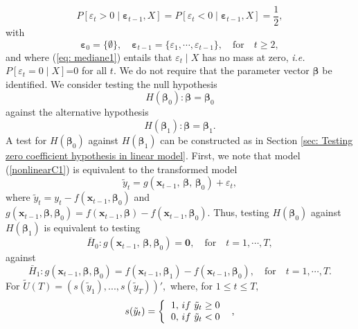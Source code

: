 \documentclass[harvard,11pt]{article}
\begin{document}
\begin{equation}\label{eq: mediane1}
P[\varepsilon_{t}> 0\mid \bm{{\varepsilon}}_{t-1},X]=P[\varepsilon_{t}<0\mid \bm{\varepsilon}_{t-1},X]=\frac{1}{2},
\end{equation}%
with
\[
\bm{\varepsilon}_{0}=\{\emptyset\},\quad\bm{\varepsilon}_{t-1}=\{\varepsilon_1,\cdots,\varepsilon_{t-1}\},\quad\text{for}\quad t\geq2,
\]
and where (\ref{eq: mediane1}) entails that $\varepsilon_t\mid X$ has no mass at zero, \emph{i.e.} $P[\varepsilon_t=0\mid X]$=0 for all $t$. We do not require that the
parameter vector $\bm{\beta} $ be identified. We consider testing the null hypothesis%
\begin{equation}
H(\bm{\beta}_{0}):\bm{\beta} =\bm{\beta} _{0}  \label{h01}
\end{equation}%
against the alternative hypothesis%
\begin{equation}
H(\bm{\beta}_{1}):\bm{\beta} =\bm{\beta}_{1}\text{.}  \label{h02}
\end{equation}%
A test for $H(\bm{\beta}_{0})$ against $H(\bm{\beta}_{1})$ can be constructed as in
Section \ref{sec: Testing zero coefficient hypothesis in linear model}.
First, we note that model (\ref{nonlinearC1}) is equivalent to the
transformed model%
\begin{equation*}
\tilde{y}_{t}=g(\bm{x}_{t-1},\,\bm{\beta} ,\,\bm{\beta} _{0})+\varepsilon_{t},
\end{equation*}%
where $\tilde{y}_{t}=y_{t}-f(\bm{x}_{t-1},\bm{\beta}_{0})$ and\ $g(\bm{x}_{t-1},\bm{\beta}
,\bm{\beta} _{0})=f(\bm{x}_{t-1},\bm{\beta} )-f(\bm{x}_{t-1},\bm{\beta}_{0})$. Thus, testing $%
H(\bm{\beta}_{0})$ against $H(\bm{\beta}_{1})$ is equivalent to testing%
\begin{equation*}
\bar{H}_{0}:g(\bm{x}_{t-1},\,\bm{\beta} ,\bm{\beta} _{0})=\bm{0},\quad\text{for}\quad t=1,\cdots,T,
\end{equation*}%
against%
\begin{equation*}
\bar{H}_{1}:g(\bm{x}_{t-1},\bm{\beta} ,\bm{\beta}_{0})=f(\bm{x}_{t-1},\bm{\beta}_{1})-f(\bm{x}_{t-1},\bm{\beta}
_{0}),\quad\text{for}\quad t=1,\cdots,T.
\end{equation*}%
For $\tilde{U}(T)=(s(\tilde{y}_{1}),...,s(\tilde{y}_{T}))',$
where, for $1\leq t\leq T,$%
\begin{equation*}
s(\tilde{y}_{t})=\left\{ 
\begin{tabular}{l}
$1,$ $if$ $\tilde{y}_{t}\geq 0$ \\ 
$0,$ $if$ $\tilde{y}_{t}<0$%
\end{tabular}%
\ \right. \text{,}
\end{equation*}%
\end{document}
